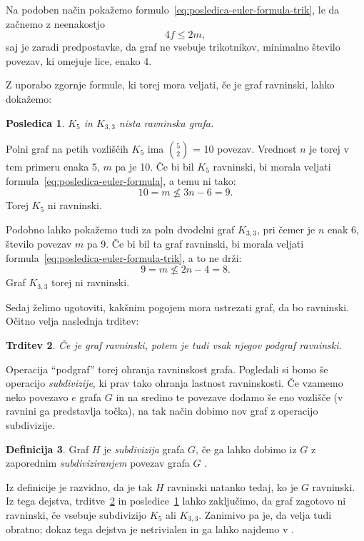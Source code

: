 \documentclass[12pt,a4paper]{amsart}
\theoremstyle{definition} %
\newtheorem{definicija}{Definicija}[section]
\theoremstyle{plain} %
\newtheorem{trditev}[definicija]{Trditev}
\newtheorem{posledica}[definicija]{Posledica}
\begin{document}
    Na podoben način pokažemo formulo~\eqref{eq:posledica-euler-formula-trik}, le da začnemo z neenakostjo 
    \[ 4f \leq 2m, \]
    saj je zaradi predpostavke, da graf ne vsebuje trikotnikov, minimalno število povezav, ki omejuje lice, enako 4. 
\endproof

Z uporabo zgornje formule, ki torej mora veljati, če je graf ravninski, lahko dokažemo:
\begin{posledica}
    \label{posl:neravninska-grafa}
    $K_5$ in $K_{3,3}$ nista ravninska grafa.
\end{posledica}

\proof
    Polni graf na petih vozliščih $K_5$ ima {$5 \choose 2$} = 10 povezav. Vrednost $n$ je torej v tem primeru enaka
    5, $m$ pa je 10. Če bi bil $K_5$ ravninski, bi morala veljati formula~\eqref{eq:posledica-euler-formula},
    a temu ni tako:
    \[ 10 = m \nleq 3n - 6 = 9. \]
    Torej $K_5$ ni ravninski.
    
    Podobno lahko pokažemo tudi za poln dvodelni graf $K_{3,3}$, pri čemer je $n$ enak 6, število povezav $m$ pa 9. Če bi bil ta graf ravninski, bi morala veljati formula~\eqref{eq:posledica-euler-formula-trik}, a to ne drži:
    \[ 9 = m \nleq 2n - 4 = 8. \] 
    Graf $K_{3,3}$ torej ni ravninski. \qedhere
\endproof

Sedaj želimo ugotoviti, kakšnim pogojem mora ustrezati graf, da bo ravninski. Očitno velja naslednja trditev:

\begin{trditev}
    \label{trd:podgraf}
    Če je graf ravninski, potem je tudi vsak njegov podgraf ravninski. %
\end{trditev}

Operacija ``podgraf'' torej ohranja ravninskost grafa.
Pogledali si bomo še operacijo \emph{subdivizije}, ki prav tako ohranja lastnost ravninskosti. Če vzamemo neko povezavo $e$ grafa $G$ in na sredino te povezave dodamo še eno vozlišče (v ravnini ga predstavlja točka), na tak način dobimo nov graf z operacijo subdivizije. \cite[str.~66]{bib:potocnik}

\begin{definicija}
    Graf $H$ je \emph{subdivizija} grafa $G$, če ga lahko dobimo iz $G$ z zaporednim \emph{subdiviziranjem} povezav grafa $G$ \cite[str.~66]{bib:potocnik}.
\end{definicija}

Iz definicije je razvidno, da je tak $H$ ravninski natanko tedaj, ko je $G$ ravninski. Iz tega dejstva, trditve~\ref{trd:podgraf} in posledice~\ref{posl:neravninska-grafa} lahko zaključimo, da graf zagotovo ni ravninski, če vsebuje subdivizijo $K_5$ ali $K_{3,3}$. Zanimivo pa je, da velja tudi obratno; dokaz tega dejstva je netrivialen in ga lahko najdemo v \cite[str.~247--251]{bib:west}.
\end{document}
